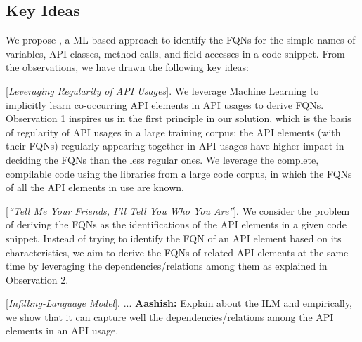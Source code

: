 \subsection{Key Ideas}
\label{sec:key}

We propose {\tool}, a ML-based approach to identify the FQNs for the
simple names of variables, API classes, method calls, and field
accesses in a code snippet. From the observations, we have drawn the
following key ideas:

\vspace{2pt}
 [{\em Leveraging Regularity of API
    Usages}].  We leverage Machine Learning to implicitly learn
co-occurring API elements in API usages to derive FQNs. Observation 1
inspires us in the first principle in our solution, which is the basis
of regularity of API usages in a large training corpus: the API
elements (with their FQNs) regularly appearing together in API usages
have higher impact in deciding the FQNs than the less regular ones. We
leverage the complete, compilable code using the libraries from a large
code corpus, in which the FQNs of all the API elements in use are
known.

\vspace{2pt}
 [{\em ``Tell Me Your Friends, I'll Tell You
    Who You Are''}]. We consider the problem of deriving the FQNs as
the identifications of the API elements in a given code snippet.
Instead of trying to identify the FQN of an API element based on its
characteristics, we aim to derive the FQNs of related API elements at
the same time by leveraging the dependencies/relations among them as
explained in Observation 2.




\vspace{2pt}
 [{\em Infilling-Language Model}]. ...
{\bf Aashish:} Explain about the ILM and empirically, we show that it
can capture well the dependencies/relations among the API elements in
an API usage.



